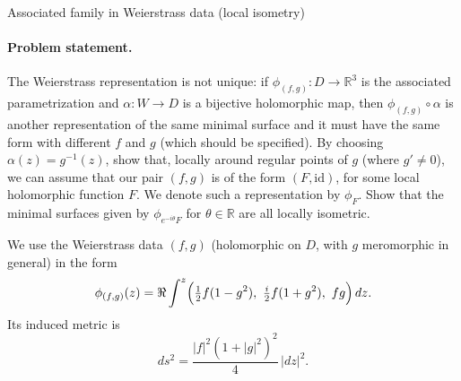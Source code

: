 \begin{problem}[CP-IV-0082]
\label{prob:cp-iv-0082}
Associated family in Weierstrass data (local isometry)

\paragraph{\textbf{Problem statement.}}
The Weierstrass representation is not unique: if $\phi_{(f,g)}:D\to\mathbb{R}^3$ is the associated parametrization and
$\alpha:W\to D$ is a bijective holomorphic map, then $\phi_{(f,g)}\circ\alpha$ is another representation of the same minimal
surface and it must have the same form with different $f$ and $g$ (which should be specified).
By choosing $\alpha(z)=g^{-1}(z)$, show that, locally around regular points of $g$ (where $g'\neq 0$), we can assume
that our pair $(f,g)$ is of the form $(F,\mathrm{id})$, for some local holomorphic function $F$. We denote such a
representation by $\phi_F$. Show that the minimal surfaces given by $\phi_{e^{-i\theta}F}$ for $\theta\in\mathbb{R}$
are all locally isometric.

\medskip

We use the Weierstrass data $(f,g)$ (holomorphic on $D$, with $g$ meromorphic in general) in the form
\[
\phi_{(f,g)}(z)
=
\Re\int^z
\Bigl(\tfrac12 f(1-g^2),\ \tfrac{i}{2}f(1+g^2),\ fg\Bigr)\,dz.
\]
Its induced metric is
\[
ds^2
=
\frac{|f|^2(1+|g|^2)^2}{4}\,|dz|^2.
\]

\medskip
\end{problem}



